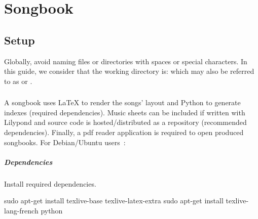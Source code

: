 \chapter{Songbook}
\setcounter{chapter}{1}
\label{chap:songbook}
\minitoc
{}


\section{Setup}
\label{sec:install}

Globally, avoid naming files or directories with spaces or special
characters. In this guide, we consider that the working directory is:
 which may also be referred to as
 or .

\subsection{\linux}

A songbook uses \LaTeX{} to render the songs' layout and Python to
generate indexes (required dependencies). Music sheets can be included
if written with Lilypond and source code is hosted/distributed as a
\git repository (recommended dependencies). Finally, a pdf reader
application is required to open produced songbooks. For Debian/Ubuntu
users~:

\paragraph{Dependencies}

Install required dependencies.
\begin{unix}
  sudo apt-get install texlive-base texlive-latex-extra
  sudo apt-get install texlive-lang-french python
\end{unix}

